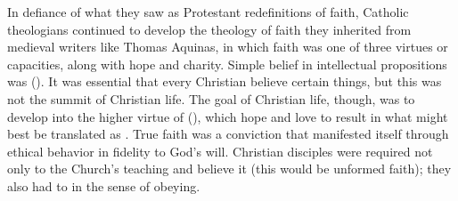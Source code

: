In defiance of what they saw as Protestant redefinitions of faith, Catholic
theologians continued to develop the theology of faith they inherited from
medieval writers like Thomas Aquinas, in which faith was one of three
virtues or capacities, along with hope and charity.%
    \Autocite[130--132]{Schreiner:Certainty}
Simple belief in intellectual propositions was 
().%
    \Autocite[]{Catholic:Catechismus1614}
It was essential that every Christian believe certain things, but this was not
the summit of Christian life.
The goal of Christian life, though, was to develop into the higher virtue of
 (), which  hope
and love to result in  what might best be translated as .
True faith was a conviction that manifested itself through ethical behavior in
fidelity to God's will.
Christian disciples were required not only to  the Church's
teaching and believe it (this would be unformed faith); they also had to
 in the sense of obeying.

